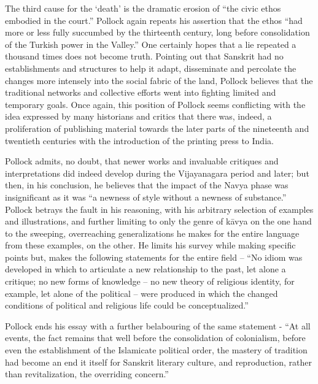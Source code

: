 The third cause for the ‘death’ is the dramatic erosion of “the civic ethos embodied in the court.” Pollock again repeats his assertion that the ethos “had more or less fully succumbed by the thirteenth century, long before consolidation of the Turkish power in the Valley.” One certainly hopes that a lie  repeated a thousand times does not become truth. Pointing out that Sanskrit had no establishments and structures to help it adapt, disseminate and percolate the changes more intensely into the social fabric of the land, Pollock believes that the traditional networks and collective efforts went into fighting limited and temporary goals. Once again, this position of Pollock seems conflicting with the idea expressed by many historians and critics that there was, indeed, a proliferation of publishing material towards the later parts of the nineteenth and twentieth centuries with the introduction of the printing press to India.
\newpage

Pollock admits, no doubt, that newer works and invaluable critiques and interpretations did indeed develop during the Vijayanagara period and later; but then, in his conclusion, he believes that the impact of the Navya phase was insignificant as it was “a newness of style without a newness of substance.” Pollock betrays the fault in his reasoning, with his arbitrary selection of examples and illustrations, and further limiting to only the genre of kāvya on the one hand to the sweeping, overreaching generalizations he makes for the entire language from these examples, on the other. He limits his survey while making specific points but, makes the following statements for the entire field – “No idiom was developed in which to articulate a new relationship to the past, let alone a critique; no new forms of knowledge – no new theory of religious identity, for example, let alone of the political – were produced in which the changed conditions of political and religious life could be conceptualized.”

Pollock ends his essay with a further belabouring of the same statement - “At all events, the fact remains that well before the consolidation of colonialism, before even the establishment of the Islamicate political order, the mastery of tradition had become an end it itself for Sanskrit literary culture, and reproduction, rather than revitalization, the overriding concern.”   

